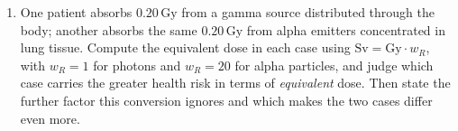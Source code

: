 \documentclass[11pt,a4paper]{article}
\newcommand{\unit}[1]{\,\mathrm{#1}}
\newenvironment{parts}{\begin{enumerate}[label=\textbf{\alph*)}]}{\end{enumerate}}
\begin{document}
\begin{parts}
\begin{enumerate}[label=\roman*.]
      \item What activity remains after $12.0\unit{h}$? Explain with
            $N=N_0e^{-\lambda t}$ why the number of nuclei in the sample does
            not visibly change over that time, and compute the initial number
            of nuclei.
      \item Why is ${}^{131}\mathrm{I}$ --- a $\beta^-$ and $\gamma$ emitter
            with an eight-day half-life --- well suited to thyroid imaging,
            whereas a pure $\alpha$ emitter of the same activity would be
            useless for it?
      \end{enumerate}
\item One patient absorbs $0.20\unit{Gy}$ from a gamma source distributed
      through the body; another absorbs the same $0.20\unit{Gy}$ from alpha
      emitters concentrated in lung tissue. Compute the equivalent dose in
      each case using $\mathrm{Sv}=\mathrm{Gy}\cdot w_R$, with $w_R=1$ for
      photons and $w_R=20$ for alpha particles, and judge which case carries
      the greater health risk in terms of \emph{equivalent} dose. Then state
      the further factor this conversion ignores and which makes the two cases
      differ even more.
\end{parts}
\end{document}
